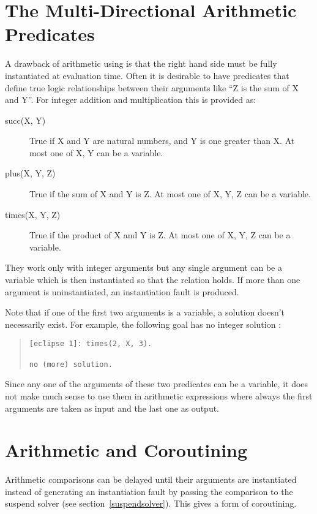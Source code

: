 \section{The Multi-Directional Arithmetic Predicates}
A drawback of arithmetic using  is that the right hand side must
be fully instantiated at evaluation time.
Often it is desirable to have predicates that define true logic
relationships between their arguments like ``Z is the sum of X and Y''.
For integer addition and multiplication this is provided as:
\begin{description}
\item[succ(X, Y)]
True if X and Y are natural numbers, and Y is one greater than X.
At most one of X, Y can be a variable.

\item[plus(X, Y, Z)]
True if the sum of X and Y is Z. At most one of X, Y, Z can be a variable.

\item[times(X, Y, Z)]
True if the product of X and Y is Z. At most one of X, Y, Z can be a variable.

\end{description}

They work only with integer arguments but any single argument
can be a variable which is then instantiated so that the relation holds.
If more than one argument is uninstantiated, an instantiation fault is produced.

Note that if one of the first two arguments is a variable,
a solution doesn't necessarily exist. For example, the following goal has
no integer solution :
\begin{quote}
\begin{verbatim}
[eclipse 1]: times(2, X, 3).

no (more) solution.
\end{verbatim}\end{quote}

Since any one of the arguments of these two predicates can be a variable,
it does not make much sense to use them in arithmetic expressions
where always the first arguments are taken as input and the last
one as output.  

\section{Arithmetic and Coroutining}
\label{arithdelay}

Arithmetic comparisons can be delayed until their arguments are
instantiated instead of generating an instantiation fault by passing the
comparison to the suspend solver (see section~\ref{suspendsolver}). This
gives a form of coroutining.


